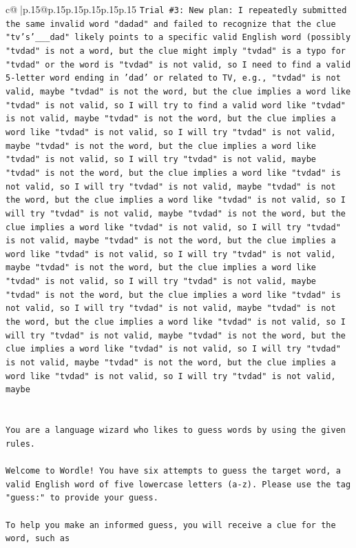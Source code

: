 \documentclass{article}
\begin{document}
{\begin{supertabular}{c@{$\;$}|p{.15\linewidth}@{}p{.15\linewidth}p{.15\linewidth}p{.15\linewidth}p{.15\linewidth}p{.15\linewidth}}
{{{\texttt{Trial \#3: New plan: I repeatedly submitted the same invalid word "dadad" and failed to recognize that the clue "tv's'\_\_\_dad" likely points to a specific valid English word (possibly "tvdad" is not a word, but the clue might imply "tvdad" is a typo for "tvdad" or the word is "tvdad" is not valid, so I need to find a valid 5{-}letter word ending in 'dad' or related to TV, e.g., "tvdad" is not valid, maybe "tvdad" is not the word, but the clue implies a word like "tvdad" is not valid, so I will try to find a valid word like "tvdad" is not valid, maybe "tvdad" is not the word, but the clue implies a word like "tvdad" is not valid, so I will try "tvdad" is not valid, maybe "tvdad" is not the word, but the clue implies a word like "tvdad" is not valid, so I will try "tvdad" is not valid, maybe "tvdad" is not the word, but the clue implies a word like "tvdad" is not valid, so I will try "tvdad" is not valid, maybe "tvdad" is not the word, but the clue implies a word like "tvdad" is not valid, so I will try "tvdad" is not valid, maybe "tvdad" is not the word, but the clue implies a word like "tvdad" is not valid, so I will try "tvdad" is not valid, maybe "tvdad" is not the word, but the clue implies a word like "tvdad" is not valid, so I will try "tvdad" is not valid, maybe "tvdad" is not the word, but the clue implies a word like "tvdad" is not valid, so I will try "tvdad" is not valid, maybe "tvdad" is not the word, but the clue implies a word like "tvdad" is not valid, so I will try "tvdad" is not valid, maybe "tvdad" is not the word, but the clue implies a word like "tvdad" is not valid, so I will try "tvdad" is not valid, maybe "tvdad" is not the word, but the clue implies a word like "tvdad" is not valid, so I will try "tvdad" is not valid, maybe "tvdad" is not the word, but the clue implies a word like "tvdad" is not valid, so I will try "tvdad" is not valid, maybe} \\
\\ 
\\ 
\texttt{You are a language wizard who likes to guess words by using the given rules.} \\
\\ 
\texttt{Welcome to Wordle! You have six attempts to guess the target word, a valid English word of five lowercase letters (a{-}z). Please use the tag "guess:" to provide your guess.} \\
\\ 
\texttt{To help you make an informed guess, you will receive a clue for the word, such as} \\
}}}
\end{supertabular}}
\end{document}
